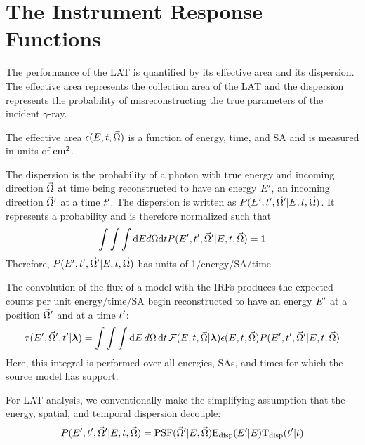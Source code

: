 \section{The  Instrument Response Functions}

The performance of the LAT is quantified by its effective area and
its dispersion. The effective area represents the collection area of the
\ac{LAT} and the dispersion represents the probability of misreconstructing
the true parameters of the incident $\gamma$-ray.

The effective area $\epsilon(E,t,\vec\Omega)$ is a
function of energy, time, and \ac{SA} and is measured in units of $\text{cm}^2$.

The dispersion is the probability of a photon with true energy
\energy and incoming direction $\vec\Omega$ at time \time being
reconstructed to have an energy $E'$, an incoming direction
$\vec\Omega'$ at a time $t'$.  The dispersion is written as
$P(E',t',\vec\Omega'|E,t,\vec\Omega)$.
It represents a probability and is therefore normalized such that
\begin{equation}
  \int \int \int \text{d}E d\Omega \text{d}t 
  P(E',t',\vec\Omega'|E,t,\vec\Omega) = 1
\end{equation}
Therefore,
$P(E',t',\vec\Omega'|E,t,\vec\Omega)$
has units of 1/energy/\acl{SA}/time

The convolution of the flux of a model with the \acp{IRF} produces the
expected counts per unit energy/time/\acl{SA} begin reconstructed to have
an energy $E'$ at a position $\vec\Omega'$ and at a time $t'$:
\begin{equation}
  \eqnlabel{eventrate}
  \eventrate(\energy',\solidangle',\time'|\modelparams)
  = \int \int \int \denergy \, \dsolidangle \, \dtime \,
  \fluxdensity(\energy,\time,\vec\Omega|\modelparams) 
  \effectivearea(\energy,\time,\solidangle) \dispersion(\energy',\time',\solidangle'|\energy,\time,\solidangle)
\end{equation}
Here, this integral is performed over all energies, \acp{SA}, and times
for which the source model has support.

For LAT analysis, we conventionally make the simplifying assumption that
the energy, spatial, and temporal dispersion decouple:
\begin{equation}
  P(E',t',\vec\Omega'|E,t,\vec\Omega) = 
  \text{PSF}(\vec\Omega'|E,\vec\Omega) \text{E}_\text{disp}(E'|E) \text{T}_\text{disp}(t'|t)
\end{equation}

